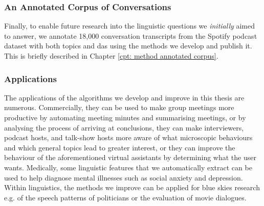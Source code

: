 \subsubsection{An Annotated Corpus of Conversations}
Finally, to enable future research into the linguistic questions we \textit{initially} aimed to answer, we annotate 18,000 conversation transcripts from the Spotify podcast dataset\cite{clifton-2020100000} with both topics and \glspl{da} using the methods we develop and publish it. This is briefly described in Chapter \ref{cpt: method annotated corpus}.

\subsubsection{Applications}
The applications of the algorithms we develop and improve in this thesis are numerous. Commercially, they can be used to make group meetings more productive by automating meeting minutes and summarising meetings, or by analysing the process of arriving at conclusions\cite{daApplications}, they can make interviewers, podcast hosts, and talk-show hosts more aware of what microscopic behaviours and which general topics lead to greater interest, or they can improve the behaviour of the aforementioned virtual assistants by determining what the user wants\cite{daApplications}. Medically, some linguistic features that we automatically extract can be used to help diagnose mental illnesses such as social anxiety and depression\cite{ap_psychological}. 
Within linguistics, the methods we improve can be applied for blue skies research e.g. of the speech patterns of politicians\cite{ap_trump} or the evaluation of movie dialogues\cite{movieDialogue}. \newline





%
\glsresetall